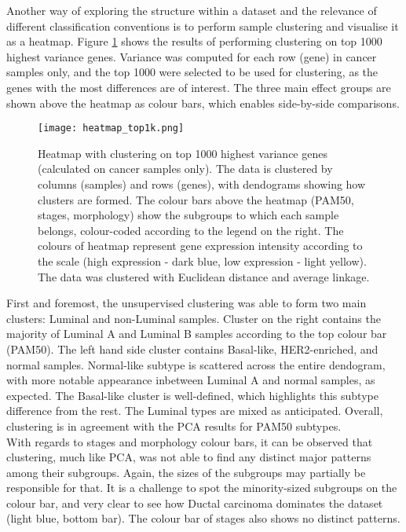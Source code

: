         
        
   
    
    Another way of exploring the structure within a dataset and the relevance of different classification conventions is to perform sample clustering and visualise it as a heatmap. Figure \ref{fig:heatmap1k} shows the results of performing clustering on top 1000 highest variance genes. Variance was computed for each row (gene) in cancer samples only, and the top 1000 were selected to be used for clustering, as the genes with the most differences are of interest. The three main effect groups are shown above the heatmap as colour bars, which enables side-by-side comparisons.     
    
            \begin{figure}[!h]
            \centering
            \texttt{[image: heatmap\_top1k.png]}
            \caption{Heatmap with clustering on top 1000 highest variance genes (calculated on cancer samples only). The data is clustered by columns (samples) and rows (genes), with dendograms showing how clusters are formed. The colour bars above the heatmap (PAM50, stages, morphology) show the subgroups to which each sample belongs, colour-coded according to the legend on the right. The colours of heatmap represent gene expression intensity according to the scale (high expression - dark blue, low expression - light yellow). The data was clustered with Euclidean distance and average linkage. }
            \label{fig:heatmap1k}
            \end{figure}
    
    First and foremost, the unsupervised clustering was able to form two main clusters: Luminal and non-Luminal samples. Cluster on the right contains the majority of Luminal A and Luminal B samples according to the top colour bar (PAM50). The left hand side cluster contains Basal-like, HER2-enriched, and normal samples. Normal-like subtype is scattered across the entire dendogram, with more notable appearance inbetween Luminal A and normal samples, as expected. The Basal-like cluster is well-defined, which highlights this subtype difference from the rest. The Luminal types are mixed as anticipated. Overall, clustering is in agreement with the PCA results for PAM50 subtypes. \\    
    With regards to stages and morphology colour bars, it can be observed that clustering, much like PCA, was not able to find any distinct major patterns among their subgroups. Again, the sizes of the subgroups may partially be responsible for that. It is a challenge to spot the minority-sized subgroups on the colour bar, and very clear to see how Ductal carcinoma dominates the dataset (light blue, bottom bar). The colour bar of stages also shows no distinct patterns. 
    
